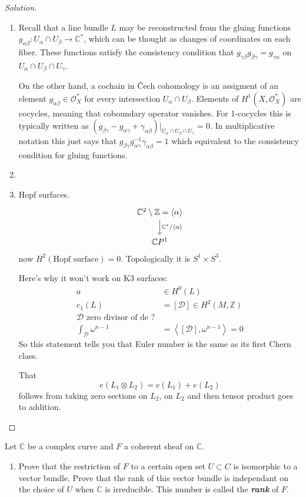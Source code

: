 \begin{proof}[Solution]\leavevmode
	\begin{enumerate}[label=\alph*.]
	\item Recall that a line bundle $L$ may be reconstructed from the gluing functions $g_{\alpha\beta}:U_\alpha \cap U_\beta\to \mathbb{C}^*$, which can be thought as changes of coordinates on each fiber. These functions satisfy the consistency condition that  $g_{\gamma\beta}g_{\beta\gamma}=g_{\gamma\alpha}$ on $U_\alpha\cap U_\beta\cap U_{\gamma}$.

		On the other hand, a cochain in \v Cech cohomology is an assigment of an element $g_{\alpha\beta}\in \mathcal{O}^*_X$ for every intersection $U_\alpha\cap U_\beta$. Elements of $H^{1}(X,\mathcal{O}^*_X)$ are cocycles, meaning that coboundary operator vanishes. For 1-cocycles this is typically written as $(g_{\beta\gamma}-g_{\alpha\gamma}+\gamma_{\alpha\beta})|_{U_\alpha\cap U_\beta\cap U_\gamma}=0$. In multiplicative notation this just says that $g_{\beta\gamma}g^{-1}_{\alpha\gamma}\gamma_{\alpha\beta}=1$ which equivalent to the consistency condition for gluing functions.


		\item 

		\item Hopf surfaces.
			\[\begin{tikzcd}
			\mathbb{C}^2\setminus \mathbb{Z}=\left<\alpha\right> \arrow[d,"\mathbb{C}^* /\left<\alpha\right> "]\\
			\mathbb{C}P^{1}
			\end{tikzcd}\]
		now $H^{2}(\text{Hopf surface} )=0$. Topologically it is $S^1\times S^3$.

		Here's why it won't work on K3 surfaces:
		\begin{align*}
			a&\in H^{0}(L)\\
			c_1(L)&=[\mathcal{D}]\in H^{2}(M,\mathbb{Z})\\
			\mathcal{D}\text{ zero divisor of de ?}\\
			\int_{\mathcal{D}}\omega^{n-1}&=\left<[\mathcal{D}],\omega^{n-1}\right> =0
		\end{align*}
		So this statement tells you that Euler number is the same as its first Chern class.

		That
		\[e(L_1\otimes L_2)=e(L_1)+e(L_2)\]
		follows from taking zero sections on $L_2$, on $L_2$ and then tensor product goes to addition.
	\end{enumerate}
\end{proof}
\begin{manualexercise}{1.8}
	Let $\mathbb{C}$ be a complex curve and $F$ a coherent sheaf on $\mathbb{C}$.
	\begin{enumerate}[label=\alph*.]
		\item Prove that the restriction of $F$ to a certain open set $U\subset C$ is isomorphic to a vector bundle. Prove that the rank of this vector bundle is independant on the choice of $U$ when $\mathbb{C}$ is irreducible. This number is called the \textit{\textbf{rank}} of $F$.
	\end{enumerate}	
\end{manualexercise}

